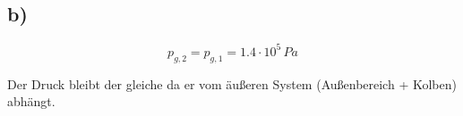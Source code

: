

\subsection*{b)}
\begin{equation*}
    p_{g,2} = p_{g,1} = 1.4 \cdot 10^5 \, Pa
\end{equation*}

Der Druck bleibt der gleiche da er vom äußeren System (Außenbereich + Kolben) abhängt.
